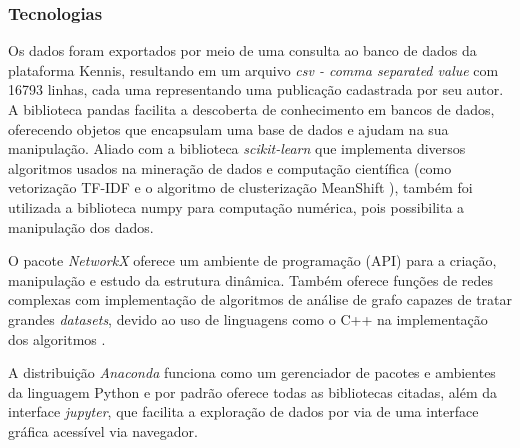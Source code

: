 \documentclass[12pt]{article}
\begin{document}
\subsubsection{Tecnologias}

Os dados foram exportados por meio de uma consulta ao banco de dados da plataforma Kennis, resultando em um arquivo \textit{csv - comma separated value} com 16793 linhas, cada uma representando uma publicação cadastrada por seu autor. A biblioteca pandas facilita a descoberta de conhecimento em bancos de dados, oferecendo objetos que encapsulam uma base de dados e ajudam na sua manipulação. Aliado com a biblioteca \textit{scikit-learn} que implementa diversos algoritmos usados na mineração de dados e computação científica (como vetorização TF-IDF e o algoritmo de clusterização MeanShift \cite{scikit-learn}), também foi utilizada a biblioteca numpy para computação numérica, pois possibilita a manipulação dos dados.

O pacote \textit{NetworkX} oferece um ambiente de programação (API) para a criação, manipulação e estudo da estrutura dinâmica. Também oferece funções de redes complexas com implementação de algoritmos de análise de grafo capazes de tratar grandes \textit{datasets}, devido ao uso de linguagens como o C++ na implementação dos algoritmos \cite{networkx2008}.

A distribuição \textit{Anaconda} funciona como um gerenciador de pacotes e ambientes da linguagem Python e por padrão oferece todas as bibliotecas citadas, além da interface \textit{jupyter}, que facilita a exploração de dados por via de uma interface gráfica acessível via navegador.
\end{document}
